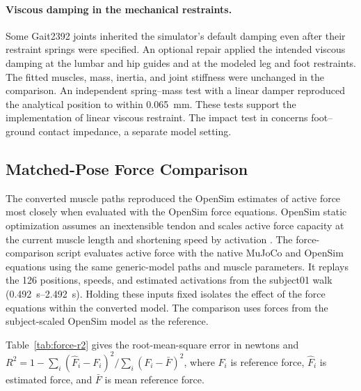 \paragraph{Viscous damping in the mechanical restraints.}
Some Gait2392 joints inherited the simulator's default damping even after their restraint springs were specified. An optional repair applied the intended viscous damping at the lumbar and hip guides and at the modeled leg and foot restraints. The fitted muscles, mass, inertia, and joint stiffness were unchanged in the comparison. An independent spring--mass test with a linear damper reproduced the analytical position to within \qty{0.065}{\milli\meter}. These tests support the implementation of linear viscous restraint. The impact test in  concerns foot--ground contact impedance, a separate model setting.

\subsection{Matched-Pose Force Comparison}
\label{sec:muscle-models-compare}

The converted muscle paths reproduced the OpenSim estimates of active force most closely when evaluated with the OpenSim force equations. OpenSim static optimization assumes an inextensible tendon and scales active force capacity at the current muscle length and shortening speed by activation \citep{opensim_static_optimization_docs,opensim_static_optimization_source}. The force-comparison script evaluates active force with the native MuJoCo and OpenSim equations using the same generic-model paths and muscle parameters. It replays the 126 positions, speeds, and estimated activations from the subject01 walk (\qtyrange{0.492}{2.492}{\second}). Holding these inputs fixed isolates the effect of the force equations within the converted model. The comparison uses forces from the subject-scaled OpenSim model as the reference.

Table~\ref{tab:force-r2} gives the root-mean-square error in newtons and $R^2=1-\sum_i(\hat F_i-F_i)^2/\sum_i(F_i-\bar F)^2$, where $F_i$ is reference force, $\hat F_i$ is estimated force, and $\bar F$ is mean reference force.

